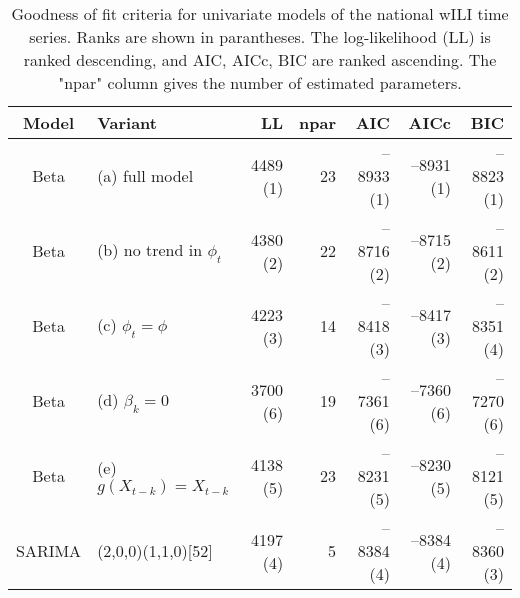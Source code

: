 \begin{table}[ht]
\centering
\begin{tabular}{cl|rrrrr}
  \hline
Model & Variant & LL & npar & AIC & AICc & BIC \\ 
  \hline
Beta & (a) full model & 4489 (1) & 23 & --8933 (1) & --8931 (1) & --8823 (1) \\ 
  Beta & (b) no trend in $\phi_t$ & 4380 (2) & 22 & --8716 (2) & --8715 (2) & --8611 (2) \\ 
  Beta & (c) $\phi_t = \phi$ & 4223 (3) & 14 & --8418 (3) & --8417 (3) & --8351 (4) \\ 
  Beta & (d) $\beta_k = 0$ & 3700 (6) & 19 & --7361 (6) & --7360 (6) & --7270 (6) \\ 
  Beta & (e) $g(X_{t-k}) = X_{t-k}$ & 4138 (5) & 23 & --8231 (5) & --8230 (5) & --8121 (5) \\ 
   \hline
SARIMA & (2,0,0)(1,1,0)[52] & 4197 (4) & 5 & --8384 (4) & --8384 (4) & --8360 (3) \\ 
   \hline
\end{tabular}
\caption{Goodness of fit criteria for univariate models of the national wILI time series.
             Ranks are shown in parantheses.
             The log-likelihood (LL) is ranked descending,
             and AIC, AICc, BIC are ranked ascending.
             The "npar" column gives the number of estimated parameters.} 
\label{tab:wILIsum}
\end{table}
